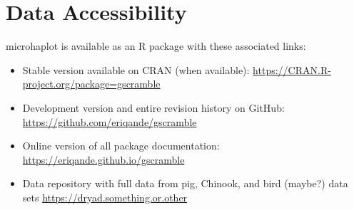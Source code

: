 \section*{Data Accessibility}

{\sc microhaplot} is available as an R package with these associated links:
\begin{itemize}
\item Stable version available on CRAN (when available): \url{https://CRAN.R-project.org/package=gscramble}
\item Development version and entire revision history on GitHub: \url{https://github.com/eriqande/gscramble}
\item Online version of all package documentation: \url{https://eriqande.github.io/gscramble}
\item Data repository with full data from pig, Chinook, and bird (maybe?) data sets \url{https://dryad.something.or.other}
\end{itemize}
\mbox{}

